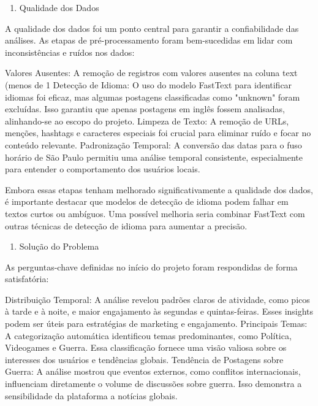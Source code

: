 \documentclass[
  letterpaper,
  DIV=11,
  numbers=noendperiod]{scrartcl}
\providecommand{\tightlist}{%
  \setlength{\itemsep}{0pt}\setlength{\parskip}{0pt}}\usepackage{longtable,booktabs,array}
\begin{document}
\begin{enumerate}
\def\labelenumi{\arabic{enumi}.}
\tightlist
\item
  Qualidade dos Dados
\end{enumerate}

A qualidade dos dados foi um ponto central para garantir a
confiabilidade das análises. As etapas de pré-processamento foram
bem-sucedidas em lidar com inconsistências e ruídos nos dados:

\begin{VerbatimWithBreaks}
Valores Ausentes:  A remoção de registros com valores ausentes na coluna text (menos de 1%
Detecção de Idioma:  O uso do modelo FastText para identificar idiomas foi eficaz, mas algumas postagens classificadas como "unknown" foram excluídas. Isso garantiu que apenas postagens em inglês fossem analisadas, alinhando-se ao escopo do projeto.
Limpeza de Texto:  A remoção de URLs, menções, hashtags e caracteres especiais foi crucial para eliminar ruído e focar no conteúdo relevante.
Padronização Temporal:  A conversão das datas para o fuso horário de São Paulo permitiu uma análise temporal consistente, especialmente para entender o comportamento dos usuários locais.
 
\end{VerbatimWithBreaks}

Embora essas etapas tenham melhorado significativamente a qualidade dos
dados, é importante destacar que modelos de detecção de idioma podem
falhar em textos curtos ou ambíguos. Uma possível melhoria seria
combinar FastText com outras técnicas de detecção de idioma para
aumentar a precisão.

\begin{enumerate}
\def\labelenumi{\arabic{enumi}.}
\setcounter{enumi}{1}
\tightlist
\item
  Solução do Problema
\end{enumerate}

As perguntas-chave definidas no início do projeto foram respondidas de
forma satisfatória:

\begin{VerbatimWithBreaks}
Distribuição Temporal:  A análise revelou padrões claros de atividade, como picos à tarde e à noite, e maior engajamento às segundas e quintas-feiras. Esses insights podem ser úteis para estratégias de marketing e engajamento.
Principais Temas:  A categorização automática identificou temas predominantes, como Política, Videogames e Guerra. Essa classificação fornece uma visão valiosa sobre os interesses dos usuários e tendências globais.
Tendência de Postagens sobre Guerra:  A análise mostrou que eventos externos, como conflitos internacionais, influenciam diretamente o volume de discussões sobre guerra. Isso demonstra a sensibilidade da plataforma a notícias globais.
 
\end{VerbatimWithBreaks}
\end{document}
